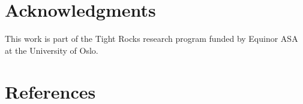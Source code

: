 \documentclass[12pt,a4paper,final]{iopart}
\begin{document}
\section{Acknowledgments}
This work is part of the Tight Rocks research program funded by Equinor ASA at the University of Oslo.

\section*{References}


%


\end{document}
